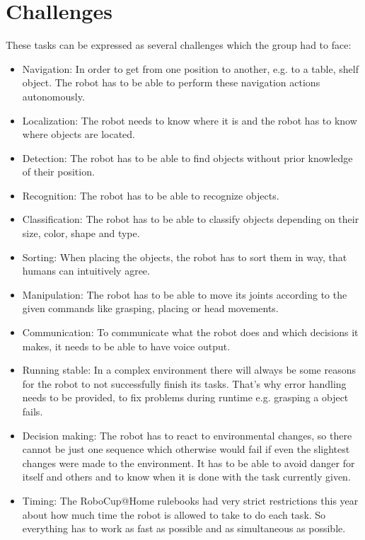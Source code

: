 \documentclass[main.tex]{subfiles}
\begin{document}
	\section{Challenges} 
	These tasks can be expressed as several challenges which the group had to face:
	\begin{itemize}
		\item Navigation: In order to get from one position to another, e.g. to a table, shelf object. The robot has to be able to perform these navigation actions autonomously. 
		\item Localization: The robot needs to know where it is and the robot has to know where objects are located.
		\item Detection: The robot has to be able to find objects without prior knowledge of their position.
		\item Recognition: The robot has to be able to recognize objects.
		\item Classification: The robot has to be able to classify objects depending on their size, color, shape and type.
		\item Sorting: When placing the objects, the robot has to sort them in way, that humans can intuitively agree.
		\item Manipulation: The robot has to be able to move its joints according to the given commands like grasping, placing or head movements.
		\item Communication: To communicate what the robot does and which decisions it makes, it needs to be able to have voice output.
		\item Running stable: In a complex environment there will always be some reasons for the robot to not successfully finish its tasks. That's why error handling needs to be provided, to fix problems during runtime e.g. grasping a object fails.
		\item Decision making: The robot has to react to environmental changes, so there cannot be just one sequence which otherwise would fail if even the slightest changes were made to the environment. It has to be able to avoid danger for itself and others and to know when it is done with the task currently given.
		\item Timing: The RoboCup@Home rulebooks had very strict restrictions this year about how much time the robot is allowed to take to do each task. So everything has to work as fast as possible and as simultaneous as possible.
		
	\end{itemize}
\end{document}
